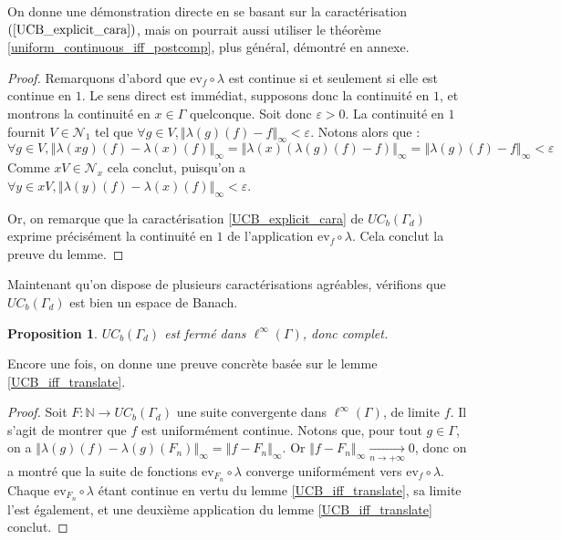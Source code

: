 \documentclass[a4paper,12pt]{article}
\newtheorem{proposition}[theorem]{Proposition}
\newcommand{\N}{\mathbb{N}}
\newcommand{\ev}{\mathrm{ev}}
\newcommand{\norm}[1]{\left\Vert #1\right\Vert}
\newcommand{\ssi}{si et seulement si }
\newcommand{\comp}{\circ}
\newcommand{\nhds}{\mathcal{N}}
\newcommand{\TODO}[1]{{\color{red}TODO :} #1}
\begin{document}
On donne une démonstration directe en se basant sur la caractérisation $(\ref{UCB_explicit_cara})$, mais on 
pourrait aussi utiliser le théorème \ref{uniform_continuous_iff_postcomp}, plus général, démontré en annexe.

\begin{proof}
    Remarquons d'abord que $\ev_f\comp\lambda$ est continue \ssi elle est continue en $1$. Le sens direct est immédiat, supposons donc 
    la continuité en $1$, et montrons la continuité en $x\in\Gamma$ quelconque. Soit donc $\varepsilon>0$. La continuité en $1$ fournit 
    $V\in\nhds_1$ tel que $\forall g\in V, \norm{\lambda(g)(f) - f}_\infty<\varepsilon$. Notons alors que :
    \begin{equation*}
        \forall g\in V, \norm{\lambda(xg)(f) - \lambda(x)(f)}_\infty = \norm{\lambda(x)(\lambda(g)(f) - f)}_\infty = \norm{\lambda(g)(f) - f}_\infty < \varepsilon
    \end{equation*}
    Comme $xV\in\nhds_x$ cela conclut, puisqu'on a $\forall y\in xV, \norm{\lambda(y)(f) - \lambda(x)(f)}_\infty < \varepsilon$.

    Or, on remarque que la caractérisation \ref{UCB_explicit_cara} de $UC_b(\Gamma_d)$ exprime précisément la continuité en $1$ de l'application $\ev_f\comp\lambda$.
    Cela conclut la preuve du lemme.
\end{proof}

Maintenant qu'on dispose de plusieurs caractérisations agréables, vérifions que $UC_b(\Gamma_d)$ est bien un espace de Banach.

\begin{proposition}\label{UCB_complete}
    $UC_b(\Gamma_d)$ est fermé dans $\ell^\infty(\Gamma)$, donc complet.
\end{proposition}

Encore une fois, on donne une preuve concrète basée sur le lemme \ref{UCB_iff_translate}. 

\begin{proof}
    Soit $F:\N\to UC_b(\Gamma_d)$ une suite convergente dans $\ell^\infty(\Gamma)$, de limite $f$.
    Il s'agit de montrer que $f$ est uniformément continue. Notons que, pour tout $g\in\Gamma$, on a $\norm{\lambda(g)(f) - \lambda(g)(F_n)}_\infty = \norm{f - F_n}_\infty$.
    Or $\norm{f - F_n}_\infty\xrightarrow[n\to+\infty]{}0$, donc on a montré que la suite de fonctions $\ev_{F_n}\comp\lambda$ converge 
    uniformément vers $\ev_f\comp\lambda$. Chaque $\ev_{F_n}\comp\lambda$ étant continue en vertu du lemme \ref{UCB_iff_translate},
    sa limite l'est également, et une deuxième application du lemme \ref{UCB_iff_translate} conclut.
\end{proof}
\end{document}
